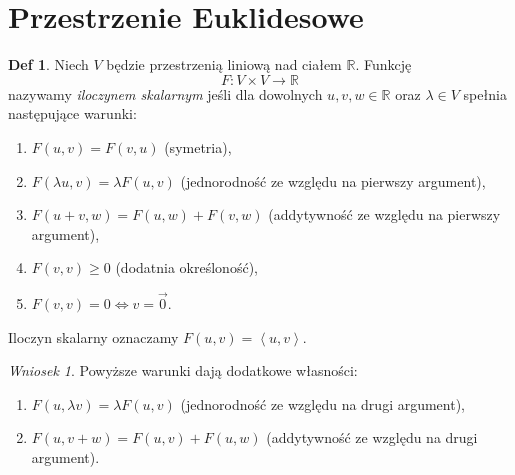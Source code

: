 \documentclass[a4paper, 12pt]{mwart}
\theoremstyle{definition}
\newtheorem{definicja}{Def}[section]
\theoremstyle{plain}
\theoremstyle{remark}
\newtheorem{wniosek}{Wniosek}[section]
\begin{document}
\section{Przestrzenie Euklidesowe} %
\begin{definicja}
	Niech $V$ będzie przestrzenią liniową nad ciałem $\mathbb{R}$. Funkcję
	\begin{equation}
		F:V \times V \to \mathbb{R}
	\end{equation}
	nazywamy \emph{iloczynem skalarnym} jeśli dla dowolnych $u, v, w \in \mathbb{R}$ oraz $\lambda \in V$ spełnia następujące warunki:
	\begin{enumerate}
		\item $F(u, v) = F(v, u)$ \quad (symetria),
		\item $F(\lambda u, v) = \lambda F(u, v)$ \quad (jednorodność ze względu na pierwszy argument),
		\item $F(u + v, w) = F(u, w) + F(v, w)$ \quad (addytywność ze względu na pierwszy argument),
		\item $F(v, v) \geq 0$ \quad (dodatnia określoność),
		\item $F(v, v) = 0 \iff v = \vec 0$.
		\setcounter{warunkiIloczynuSkalarnego}{\value{enumi}}
	\end{enumerate}
	Iloczyn skalarny oznaczamy $F(u, v) = \left<u, v\right>$.
\end{definicja}
\begin{wniosek}
	Powyższe warunki dają dodatkowe własności:
	\begin{enumerate}
		\setcounter{enumi}{\value{warunkiIloczynuSkalarnego}}
		\item $F(u, \lambda v) = \lambda F(u, v)$ \quad (jednorodność ze względu na drugi argument),
		\item $F(u, v + w) = F(u, v) + F(u, w)$ \quad (addytywność ze względu na drugi argument).
	\end{enumerate}
\end{wniosek}
\end{document}
